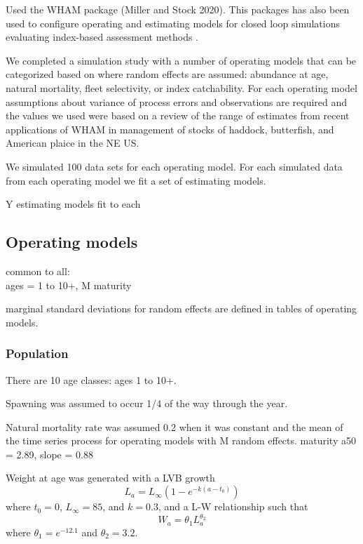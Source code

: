 \documentclass[
  12pt,
]{article}
\begin{document}
Used the WHAM package \citep[][commit 77bbd94]{stockmiller21} (Miller
and Stock 2020). This packages has also been used to configure operating
and estimating models for closed loop simulations evaluating index-based
assessment methods \citep{legaultetalinpress}.

We completed a simulation study with a number of operating models that
can be categorized based on where random effects are assumed: abundance
at age, natural mortality, fleet selectivity, or index catchability. For
each operating model assumptions about variance of process errors and
observations are required and the values we used were based on a review
of the range of estimates from recent applications of WHAM in management
of stocks of haddock, butterfish, and American plaice in the NE US.

We simulated 100 data sets for each operating model. For each simulated
data from each operating model we fit a set of estimating models.

Y estimating models fit to each

\hypertarget{operating-models}{%
\subsection{Operating models}\label{operating-models}}

common to all:\\
ages = 1 to 10+, M maturity

marginal standard deviations for random effects are defined in tables of
operating models.

\hypertarget{population}{%
\subsubsection{Population}\label{population}}

There are 10 age classes: ages 1 to 10+.

Spawning was assumed to occur 1/4 of the way through the year.

Natural mortality rate was assumed 0.2 when it was constant and the mean
of the time series process for operating models with M random effects.
maturity a50 = 2.89, slope = 0.88

Weight at age was generated with a LVB growth \[
L_a = L_{\infty}\left(1 - e^{-k(a - t_0)}\right)
\] where \(t_0 = 0\), \(L_\infty = 85\), and \(k = 0.3\), and a L-W
relationship such that \[
W_a = \theta_1 L_a^{\theta_2}
\] where \(\theta_1 = e^{-12.1}\) and \(\theta_2 = 3.2\).
\end{document}
